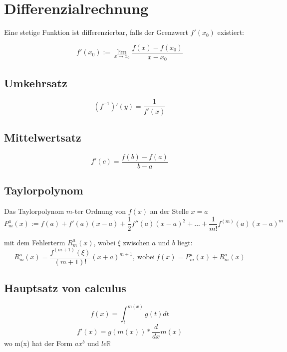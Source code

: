 \documentclass[11pt]{article}
\begin{document}
\section{Differenzialrechnung}

Eine stetige Funktion ist differenzierbar, falls der Grenzwert $f'(x_0)$ existiert:

\begin{equation*}
	f'(x_0) := \lim_{x\to x_0}\frac{f(x) - f(x_0)}{x-x_0}
\end{equation*}

\subsection{Umkehrsatz}

\begin{equation*}
	(f^{-1})'(y) = \frac{1}{f'(x)}
\end{equation*}

\subsection{Mittelwertsatz}

\begin{equation*}
	f'(c) = \frac{f(b) - f(a)}{b - a}
\end{equation*}

\subsection{Taylorpolynom}

Das Taylorpolynom $m$-ter Ordnung von $f(x)$ an der Stelle $x=a$
\begin{equation*}
	P^a_m(x) := f(a) + f'(a)(x-a) + \frac{1}{2}f''(a)(x-a)^2 + ... + \frac{1}{m!} f^{(m)}(a)(x-a)^m
\end{equation*}

mit dem Fehlerterm $R^a_m(x)$, wobei $\xi$ zwischen $a$ und $b$ liegt:
\begin{equation*}
	R^a_m(x) = \frac{f^{(m+1)}(\xi)}{(m+1)!}(x+a)^{m+1},\ \text{wobei}\ f(x) = P^a_m(x) + R^a_m(x)
\end{equation*}

\subsection{Hauptsatz von calculus}
\begin{equation*}
	f(x)=\int^{m(x)}_lg(t)dt
\end{equation*}
\begin{equation*}
	f'(x)=g(m(x))*\frac{d}{dx}m(x)
\end{equation*}
wo m(x) hat der Form $ax^b$ und $l\epsilon \mathbb{R}$
\end{document}
